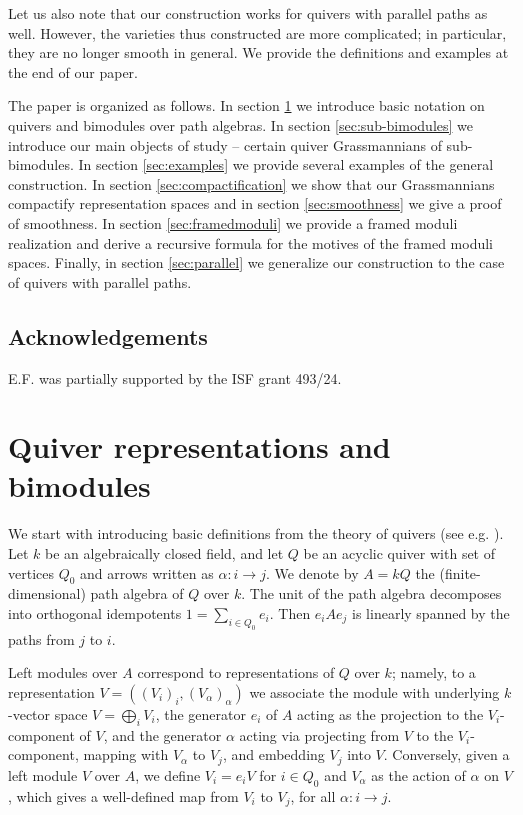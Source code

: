 \documentclass[12pt,a4paper]{amsart}
\numberwithin{equation}{section}
\theoremstyle{remark}
\begin{document}
Let us also note that our construction works for quivers with parallel paths as well.
However, the varieties thus constructed are more complicated; in particular, they are
no longer smooth in general. We provide the definitions and examples at the end of our
paper.

The paper is organized as follows. In section \ref{sec:quiversandbimodules} we introduce basic notation on quivers and bimodules over path algebras.
In section \ref{sec:sub-bimodules} we introduce our main objects of study -- certain quiver Grassmannians of sub-bimodules.
In section \ref{sec:examples} we provide several examples of the general construction.
In section \ref{sec:compactification} we show that our Grassmannians compactify representation 
spaces and in section \ref{sec:smoothness} we give a proof of smoothness.
In section \ref{sec:framedmoduli} we provide a framed moduli realization and derive a recursive formula for the motives of the framed moduli spaces. 
Finally, in section \ref{sec:parallel} we generalize our construction to the case of quivers with parallel paths.



\subsection*{Acknowledgements} 
E.F. was partially supported by the ISF grant 493/24.

\section{Quiver representations and bimodules}\label{sec:quiversandbimodules}
We start with introducing basic definitions from the theory of quivers (see e.g. \cite{ASS06,Sch14}).
Let $k$  be an algebraically closed field, and let $Q$ be an acyclic quiver with set of vertices $Q_0$ 
and arrows written as $\alpha:i\rightarrow j$. We denote by $A=kQ$ the (finite-dimensional) path algebra 
of $Q$ over $k$. The unit of the path algebra decomposes into orthogonal idempotents
$1=\sum_{i\in Q_0}e_i$. Then $e_iAe_j$ is linearly spanned by the paths from $j$ to $i$.

Left modules over $A$ correspond to representations of $Q$ over $k$; namely, to a representation
$V=((V_i)_i,(V_\alpha)_\alpha)$ we associate the module with underlying $k$-vector space
$V=\bigoplus_iV_i$, the generator $e_i$ of $A$ acting as the projection to the $V_i$-component of $V$,
and the generator $\alpha$ acting via projecting from $V$ to the $V_i$-component, 
mapping with $V_\alpha$ to $V_j$, and embedding $V_j$ into $V$. Conversely, given a left module 
$V$ over $A$, we define $V_i=e_iV$ for $i\in Q_0$ and $V_\alpha$ as the action of $\alpha$ on $V$, 
which gives a well-defined map from $V_i$ to $V_j$, for all $\alpha:i\rightarrow j$.
\end{document}
